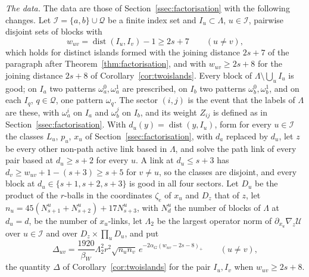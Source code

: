 \documentclass[11pt]{amsart}
\theoremstyle{definition}
\theoremstyle{remark}
\numberwithin{equation}{section}
\newcommand{\dist}{\operatorname{dist}}
\begin{document}
\emph{The data.} The data are those of Section~\ref{ssec:factorisation} with
the following changes. Let $\mathcal I=\{a,b\}\cup\mathcal Q$ be a finite
index set and $I_u\subset\Lambda$, $u\in\mathcal I$, pairwise disjoint sets
of blocks with
\[
w_{uv}=\dist(I_u,I_v)-1\ge2s+7\qquad(u\ne v),
\]
which holds for distinct islands formed with the joining distance $2s+7$ of
the paragraph after Theorem~\ref{thm:factorisation}, and with $w_{uv}\ge
2s+8$ for the joining distance $2s+8$ of Corollary~\ref{cor:twoislands}.
Every block of $\Lambda\setminus\bigcup_uI_u$ is good; on $I_a$ two patterns
$\omega_a^0,\omega_a^1$ are prescribed, on $I_b$ two patterns
$\omega_b^0,\omega_b^1$, and on each $I_q$, $q\in\mathcal Q$, one pattern
$\omega_q$. The sector $(i,j)$ is the event that the labels of $\Lambda$ are
these, with $\omega_a^i$ on $I_a$ and $\omega_b^j$ on $I_b$, and its weight
$Z_{ij}$ is defined as in Section~\ref{ssec:factorisation}. With
$d_u(y)=\dist(y,I_u)$, form for every $u\in\mathcal I$ the classes $L_u$,
$p_u$, $x_u$ of Section~\ref{ssec:factorisation}, with $d_a$ replaced by $d_u$,
let $z$ be every other non-path active link based in $\Lambda$, and solve
the path link of every pair based at $d_u\ge s+2$ for every $u$. A link at
$d_u\le s+3$ has $d_v\ge w_{uv}+1-(s+3)\ge s+5$ for $v\ne u$, so the classes
are disjoint, and every block at $d_u\in\{s+1,s+2,s+3\}$ is good in all
four sectors. Let $D_u$ be the product of the $r$-balls in the coordinates
$\zeta_e$ of $x_u$ and $D_z$ that of $z$, let $n_u=45(N^u_{s+1}+N^u_{s+2})+
17N^u_{s+3}$, with $N^u_d$ the number of blocks of $\Lambda$ at $d_u=d$, be
the number of $x_u$-links, let $\Lambda_2$ be the largest operator norm of
$\partial_{x_u}\nabla_z\mathcal U$ over $u\in\mathcal I$ and over
$D_z\times\prod_uD_u$, and put
\[
\varDelta_{uv}=\frac{1920}{\beta_W}\Lambda_2^2r^2\sqrt{n_un_v}\,
e^{-2\alpha_G(w_{uv}-2s-8)_+}\qquad(u\ne v),
\]
the quantity $\varDelta$ of Corollary~\ref{cor:twoislands} for the pair
$I_u,I_v$ when $w_{uv}\ge2s+8$.
\end{document}
